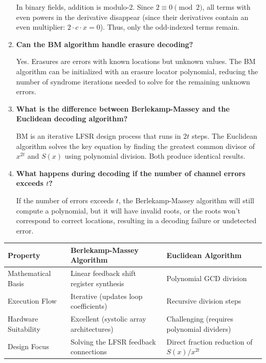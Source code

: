 \documentclass[12pt,a4paper]{article}
\newcommand{\Q}[1]{\textbf{#1}\par\noindent\ignorespaces}
\renewcommand{\arraystretch}{1.45}
\begin{document}
\begin{tcolorbox}[exambox, title={\textbf{Frequently Asked / Viva Questions}}]
\begin{enumerate}[topsep=0pt, label=\textbf{Q\arabic*.}, itemsep=5pt]
    In binary fields, addition is modulo-2. Since $2 \equiv 0 \pmod 2$, all terms with even powers in the derivative disappear (since their derivatives contain an even multiplier: $2 \cdot c \cdot x = 0$). Thus, only the odd-indexed terms remain.
  \item \Q{Can the BM algorithm handle erasure decoding?}
    Yes. Erasures are errors with known locations but unknown values. The BM algorithm can be initialized with an erasure locator polynomial, reducing the number of syndrome iterations needed to solve for the remaining unknown errors.
  \item \Q{What is the difference between Berlekamp-Massey and the Euclidean decoding algorithm?}
    BM is an iterative LFSR design process that runs in $2t$ steps. The Euclidean algorithm solves the key equation by finding the greatest common divisor of $x^{2t}$ and $S(x)$ using polynomial division. Both produce identical results.
  \item \Q{What happens during decoding if the number of channel errors exceeds $t$?}
    If the number of errors exceeds $t$, the Berlekamp-Massey algorithm will still compute a polynomial, but it will have invalid roots, or the roots won't correspond to correct locations, resulting in a decoding failure or undetected error.
\end{enumerate}
\end{tcolorbox}

\vspace{6pt}

\begin{tcolorbox}[tikzbox, title={\textbf{Comparison of Decoding Algorithms}}]
\renewcommand{\arraystretch}{1.45}
\begin{tabularx}{\linewidth}{|B{3.2cm}|Y|Y|}
\hline
\textbf{Property} & \textbf{Berlekamp-Massey Algorithm} & \textbf{Euclidean Algorithm} \\
\hline
Mathematical Basis & Linear feedback shift register synthesis & Polynomial GCD division \\
\hline
Execution Flow & Iterative (updates loop coefficients) & Recursive division steps \\
\hline
Hardware Suitability & Excellent (systolic array architectures) & Challenging (requires polynomial dividers) \\
\hline
Design Focus & Solving the LFSR feedback connections & Direct fraction reduction of $S(x)/x^{2t}$ \\
\hline
\end{tabularx}
\end{tcolorbox}
\end{document}
